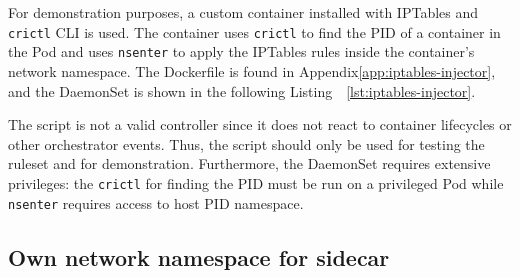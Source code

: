 \documentclass[english, 12pt, a4paper, sci, utf8, a-2b, online]{aaltothesis}
\begin{document}
For demonstration purposes, a custom container installed with IPTables and \texttt{crictl} CLI is used.
The container uses \texttt{crictl} to find the PID of a container in the Pod and uses \texttt{nsenter} to apply the IPTables rules inside the container's network namespace.
The Dockerfile is found in Appendix\ref{app:iptables-injector}, and the DaemonSet is shown in the following Listing~ \ref{lst:iptables-injector}.



The script is not a valid controller since it does not react to container lifecycles or other orchestrator events.
Thus, the script should only be used for testing the ruleset and for demonstration.
Furthermore, the DaemonSet requires extensive privileges: the \texttt{crictl} for finding the PID must be run on a privileged Pod while \texttt{nsenter} requires access to host PID namespace.

\subsection{Own network namespace for sidecar}




\end{document}
